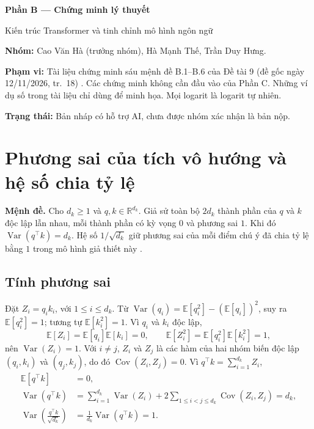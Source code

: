\documentclass[11pt,a4paper]{article}
\DeclareMathOperator{\Var}{Var}
\DeclareMathOperator{\Cov}{Cov}
\newcommand{\E}{\mathbb{E}}
\newcommand{\R}{\mathbb{R}}
\begin{document}
{\LARGE\bfseries Phần B — Chứng minh lý thuyết\par}
{\large Kiến trúc Transformer và tinh chỉnh mô hình ngôn ngữ\par}
\textbf{Nhóm:} Cao Văn Hà (trưởng nhóm), Hà Mạnh Thế, Trần Duy Hưng.\par
\textbf{Phạm vi:} Tài liệu chứng minh sáu mệnh đề B.1--B.6 của Đề tài 9 (đề gốc ngày 12/11/2026, tr.~18) \cite{de}. Các chứng minh không cần đầu vào của Phần C. Những ví dụ số trong tài liệu chỉ dùng để minh họa. Mọi logarit là logarit tự nhiên.\par
\textbf{Trạng thái:} Bản nháp có hỗ trợ AI, chưa được nhóm xác nhận là bản nộp.
\tableofcontents

\section{Phương sai của tích vô hướng và hệ số chia tỷ lệ}
\label{sec:scale}
\textbf{Mệnh đề.} Cho $d_k\ge 1$ và $q,k\in\R^{d_k}$. Giả sử toàn bộ $2d_k$ thành phần của $q$ và $k$ độc lập lẫn nhau, mỗi thành phần có kỳ vọng $0$ và phương sai $1$. Khi đó $\Var(q^\top k)=d_k$. Hệ số $1/\sqrt{d_k}$ giữ phương sai của mỗi điểm chú ý đã chia tỷ lệ bằng $1$ trong mô hình giả thiết này \cite[§3.2.1, chú thích 4]{attention}.

\subsection*{Tính phương sai}
Đặt $Z_i=q_i k_i$, với $1\le i\le d_k$. Từ $\Var(q_i)=\E[q_i^2]-(\E[q_i])^2$, suy ra $\E[q_i^2]=1$; tương tự $\E[k_i^2]=1$. Vì $q_i$ và $k_i$ độc lập,
\[
  \E[Z_i]=\E[q_i]\E[k_i]=0,\qquad
  \E[Z_i^2]=\E[q_i^2]\E[k_i^2]=1,
\]
nên $\Var(Z_i)=1$. Với $i\ne j$, $Z_i$ và $Z_j$ là các hàm của hai nhóm biến độc lập $(q_i,k_i)$ và $(q_j,k_j)$, do đó $\Cov(Z_i,Z_j)=0$. Vì $q^\top k=\sum_{i=1}^{d_k} Z_i$,
\begin{align*}
  \E[q^\top k]&=0,\\
  \Var(q^\top k)
    &=\sum_{i=1}^{d_k}\Var(Z_i)+2\sum_{1\le i<j\le d_k}\Cov(Z_i,Z_j)=d_k,\\
  \Var\!\left(\frac{q^\top k}{\sqrt{d_k}}\right)&=\frac{1}{d_k}\Var(q^\top k)=1.
\end{align*}
\end{document}
